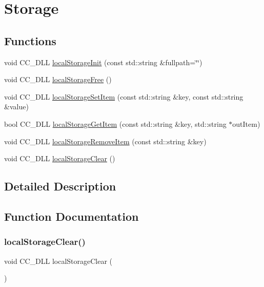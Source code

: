 \hypertarget{group__storage}{}\section{Storage}
\label{group__storage}
\subsection*{Functions}
\begin{DoxyCompactItemize}
\item 
void C\+C\+\_\+\+D\+LL \hyperlink{group__storage_ga07e3906a1639233bf64ed9905159419f}{local\+Storage\+Init} (const std\+::string \&fullpath=\char`\"{}\char`\"{})
\item 
void C\+C\+\_\+\+D\+LL \hyperlink{group__storage_ga8d3a50222f9b9cf6685878be2eb28b1a}{local\+Storage\+Free} ()
\item 
void C\+C\+\_\+\+D\+LL \hyperlink{group__storage_gad0eeb24b389402c0cc09b5f5c019bbcb}{local\+Storage\+Set\+Item} (const std\+::string \&key, const std\+::string \&value)
\item 
bool C\+C\+\_\+\+D\+LL \hyperlink{group__storage_gaa497c8448ee5436757664a245ff8b8a3}{local\+Storage\+Get\+Item} (const std\+::string \&key, std\+::string $\ast$out\+Item)
\item 
void C\+C\+\_\+\+D\+LL \hyperlink{group__storage_ga2fa6ba39d0bb14577db8d67f17cdab02}{local\+Storage\+Remove\+Item} (const std\+::string \&key)
\item 
void C\+C\+\_\+\+D\+LL \hyperlink{group__storage_gaf0fb30c8401aa3463d67798372abe5b7}{local\+Storage\+Clear} ()
\end{DoxyCompactItemize}


\subsection{Detailed Description}


\subsection{Function Documentation}
\mbox{\label{group__storage_gaf0fb30c8401aa3463d67798372abe5b7}} 
\subsubsection{\texorpdfstring{local\+Storage\+Clear()}{localStorageClear()}}
{\footnotesize\ttfamily void C\+C\+\_\+\+D\+LL local\+Storage\+Clear (\begin{DoxyParamCaption}{ }\end{DoxyParamCaption})}

